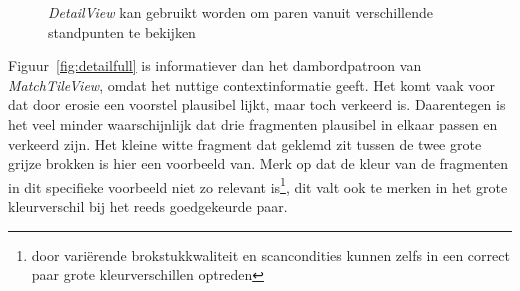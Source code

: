 \begin{figure}[!hbt]
  \centering
  \caption{\emph{DetailView} kan gebruikt worden om paren vanuit verschillende standpunten te bekijken}
  \label{fig:detail1}
\end{figure}

Figuur~\ref{fig:detailfull} is informatiever dan het dambordpatroon van \emph{MatchTileView}, omdat het nuttige contextinformatie geeft. Het komt vaak voor dat door erosie een voorstel plausibel lijkt, maar toch verkeerd is. Daarentegen is het veel minder waarschijnlijk dat drie fragmenten plausibel in elkaar passen en verkeerd zijn. Het kleine witte fragment dat geklemd zit tussen de twee grote grijze brokken is hier een voorbeeld van. Merk op dat de kleur van de fragmenten in dit specifieke voorbeeld niet zo relevant is\footnote{door vari\"erende brokstukkwaliteit en scancondities kunnen zelfs in een correct paar grote kleurverschillen optreden}, dit valt ook te merken in het grote kleurverschil bij het reeds goedgekeurde paar.\\

